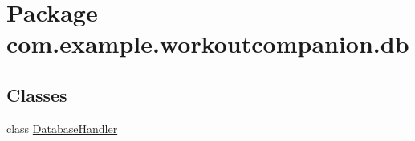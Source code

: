 \hypertarget{namespacecom_1_1example_1_1workoutcompanion_1_1db}{\section{Package com.\-example.\-workoutcompanion.\-db}
\label{namespacecom_1_1example_1_1workoutcompanion_1_1db}
}
\subsection*{Classes}
\begin{DoxyCompactItemize}
\item 
class \hyperlink{classcom_1_1example_1_1workoutcompanion_1_1db_1_1_database_handler}{Database\-Handler}
\end{DoxyCompactItemize}
